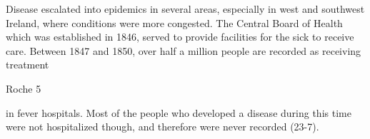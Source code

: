 \begin{Spacing}{1.5}
Disease escalated into epidemics in several areas, especially in west and southwest Ireland, where conditions were more congested. The Central Board of Health which was established in 1846, served to provide facilities for the sick to receive care. Between 1847 and 1850, over half a million people are recorded as receiving treatment 
\newpage
\thispagestyle{empty}
\begin{flushright}Roche 5\end{flushright}

in fever hospitals. Most of the people who developed a disease during this time were not hospitalized though, and therefore were never recorded (23-7). 



\end{Spacing}
